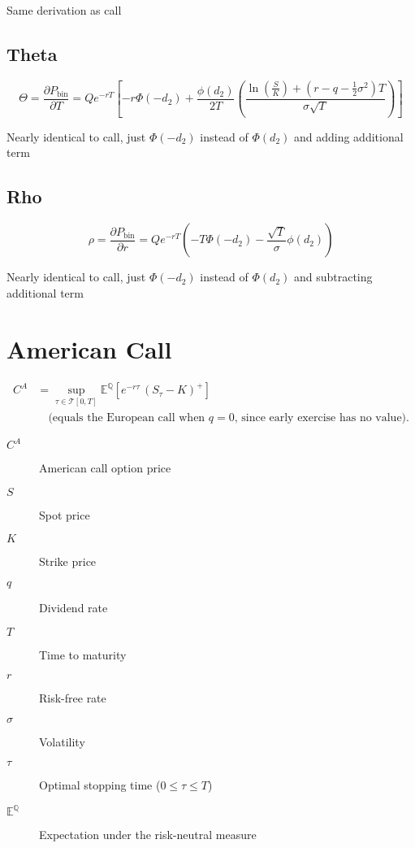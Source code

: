 \documentclass[12pt,a4paper]{article}
\begin{document}
Same derivation as call

\subsection{Theta}
\[
  \boxed{\Theta = \frac{\partial P_{\mathrm{bin}}}{\partial T} = Qe^{-rT}\!\left[-r\Phi(-d_2) + \frac{\phi(d_2)}{2T}\left(\frac{\ln(\tfrac{S}{K}) + (r - q - \tfrac{1}{2}\sigma^2)T}{\sigma\sqrt{T}}\right)\right]}
\]

Nearly identical to call, just $\Phi(-d_2)$ instead of $\Phi(d_2)$ and adding additional term

\subsection{Rho}
\[
  \boxed{\rho = \frac{\partial P_{\mathrm{bin}}}{\partial r} = Qe^{-rT}\!\left(-T\Phi(-d_2) - \frac{\sqrt{T}}{\sigma}\phi(d_2)\right)}
\]

Nearly identical to call, just $\Phi(-d_2)$ instead of $\Phi(d_2)$ and subtracting additional term

\newpage

\section{American Call}

\[
  \begin{aligned}
    C^{A} & = \sup_{\tau \in \mathcal{T}[0,T]} \mathbb{E}^{\mathbb{Q}}\!\left[ e^{-r \tau}\,(S_{\tau}-K)^{+} \right] \\[4pt]
          & \quad \text{(equals the European call when $q=0$, since early exercise has no value).}
  \end{aligned}
\]

\begin{description}
  \item[$C^{A}$] American call option price
  \item[$S$] Spot price
  \item[$K$] Strike price
  \item[$q$] Dividend rate
  \item[$T$] Time to maturity
  \item[$r$] Risk-free rate
  \item[$\sigma$] Volatility
  \item[$\tau$] Optimal stopping time (\( 0 \le \tau \le T \))
  \item[$\mathbb{E}^{\mathbb{Q}}$] Expectation under the risk-neutral measure
\end{description}
\end{document}

